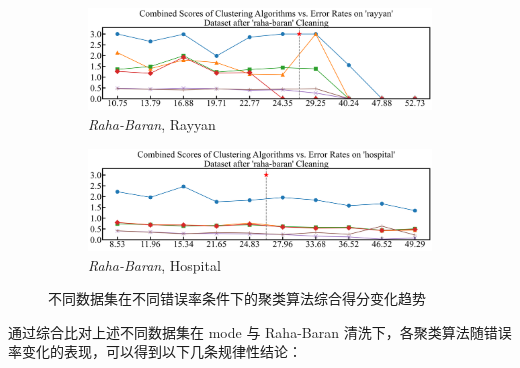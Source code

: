 \documentclass[10pt]{article} %
\numberwithin{equation}{section}
\begin{document}
\begin{figure}[H]
  \vspace{0.2em} %

  \begin{subfigure}{0.48\linewidth}
    \centering
    \includegraphics[width=\linewidth]{figures/raha-baran_rayyan_combined_scores.png}
    \caption{\textit{Raha-Baran}, Rayyan}
    \label{fig:raha_baran_rayyan}
  \end{subfigure}
  \hfill
  \begin{subfigure}{0.48\linewidth}
    \centering
    \includegraphics[width=\linewidth]{figures/raha-baran_hospital_combined_scores.png}
    \caption{\textit{Raha-Baran}, Hospital}
    \label{fig:raha_baran_hospital}
  \end{subfigure}

  \caption{不同数据集在不同错误率条件下的聚类算法综合得分变化趋势}
  \label{fig:all_combined_scores}
\end{figure}

\noindent

通过综合比对上述不同数据集在 mode 与 Raha-Baran 清洗下，各聚类算法随错误率变化的表现，可以得到以下几条规律性结论：
\end{document}
